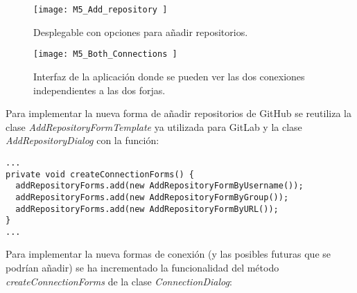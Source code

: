 \begin{figure}[!h]
	\centering
	\texttt{[image: M5\_Add\_repository ]}
	\caption{Desplegable con opciones para añadir repositorios.}\label{fig:M5_Add_repository}
\end{figure}
\FloatBarrier

\begin{figure}[!h]
	\centering
	\texttt{[image: M5\_Both\_Connections ]}
	\caption{Interfaz de la aplicación donde se pueden ver las dos conexiones independientes a las dos forjas.}\label{fig:M5_Both_Connections}
\end{figure}
\FloatBarrier

Para implementar la nueva forma de añadir repositorios de GitHub se reutiliza la clase \textit{AddRepositoryFormTemplate} ya utilizada para GitLab y la clase \textit{AddRepositoryDialog} con la función:\\

\begin{minipage}{\linewidth}
{\tiny
\begin{verbatim}
...
private void createConnectionForms() {
  addRepositoryForms.add(new AddRepositoryFormByUsername());
  addRepositoryForms.add(new AddRepositoryFormByGroup());
  addRepositoryForms.add(new AddRepositoryFormByURL());
}
...
\end{verbatim}
}
\end{minipage}

\newpage
Para implementar la nueva formas de conexión (y las posibles futuras que se podrían añadir) se ha incrementado la funcionalidad del método \textit{createConnectionForms} de la clase \textit{ConnectionDialog}:\\

